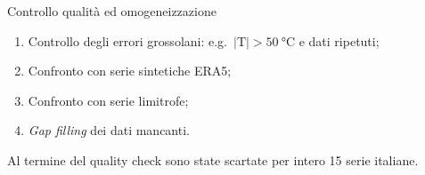 \begin{frame}{Controllo qualità ed omogeneizzazione}
  \begin{enumerate}
    \item Controllo degli errori grossolani: e.g.\ \(\lvert \mathrm{T} \rvert > \qty{50}{\degreeCelsius}\) e dati ripetuti;
    \item Confronto con serie sintetiche ERA5;
    \item Confronto con serie limitrofe;
    \item \emph{Gap filling} dei dati mancanti.
  \end{enumerate}
  Al termine del quality check sono state scartate per intero 15 serie italiane.
\end{frame}
